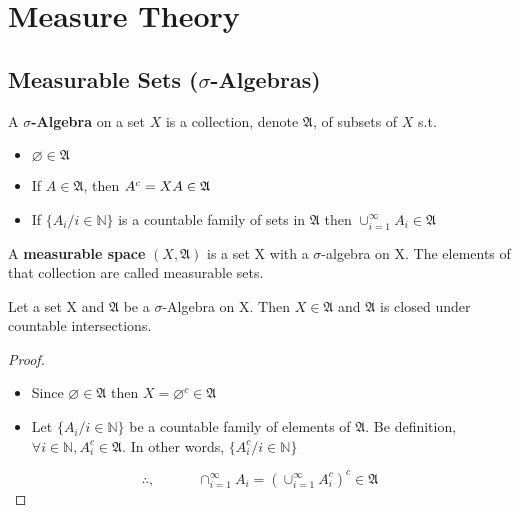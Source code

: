 \chapter{Measure Theory}
%
%
%
%


\section{Measurable Sets ($\sigma$-Algebras)}

\begin{leftbar}
\begin{define}
	A \textbf{$\sigma$-Algebra} on a set $X$ is a collection, denote $\mathfrak{A}$, of subsets of $X$ s.t.
	\begin{itemize}
		\item $ \varnothing \in \mathfrak{A}$
		\item If $A \in \mathfrak{A}$, then $A^{c}=X\\A\in\mathfrak{A}$
		\item If $\{A_{i}/i\in\mathbb{N}\}$ is a countable family of sets in $\mathfrak{A}$ then $\cup_{i=1}^{\infty}A_{i}\in\mathfrak{A}$
	\end{itemize}
\end{define}
\end{leftbar}

\begin{leftbar}
\begin{define}
	A \textbf{measurable space} $(X,\mathfrak{A})$ is a set X with a $\sigma$-algebra on X. The elements of that collection are called measurable sets.
\end{define}
\end{leftbar}


\begin{leftbar}
\begin{prop}
	Let a set X and $\mathfrak{A}$ be a $\sigma$-Algebra on X. Then $X\in\mathfrak{A}$ and $\mathfrak{A}$ is closed under countable intersections.
\end{prop}
\end{leftbar}

\begin{proof}
	\begin{itemize}
		\item Since $\varnothing \in \mathfrak{A}$ then $X=\varnothing^{c}\in\mathfrak{A}$
		\item Let $\{A_{i}/i\in\mathbb{N}\}$ be a countable family of elements of $\mathfrak{A}$. Be definition, $\forall i\in\mathbb{N}, A_{i}^{c}\in\mathfrak{A}$. In other words, $\{A_{i}^{c}/i\in\mathbb{N}\}$
	\end{itemize}
	\[\therefore,\hspace{3em} \cap_{i=1}^{\infty}A_{i}=(\cup_{i=1}^{\infty}A_{i}^{c})^{c}\in\mathfrak{A}\]
\end{proof}

